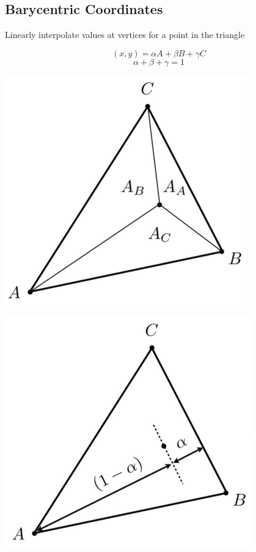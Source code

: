 \documentclass[10pt,landscape]{article}
\begin{document}
\begin{multicols}{3}
\subsection{Barycentric Coordinates}

Linearly interpolate values at vertices for a point in the triangle

$$(x, y) = \alpha A + \beta B + \gamma C$$
$$\alpha + \beta + \gamma = 1$$

\begin{multicols}{3}

\includegraphics[scale=0.2]{barycentric_area}

\columnbreak

\includegraphics[scale=0.18]{barycentric_ratio}


\end{multicols}
\end{multicols}
\end{document}
